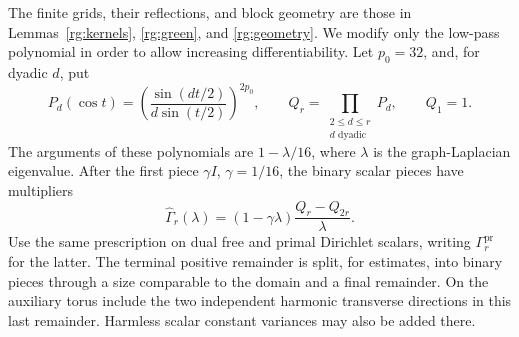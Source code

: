 The finite grids, their reflections, and block geometry are those in
Lemmas~\ref{rg:kernels}, \ref{rg:green}, and \ref{rg:geometry}. We modify
only the low-pass polynomial in order to allow increasing differentiability.
Let $p_0=32$, and, for dyadic $d$, put
\[
 P_d(\cos t)=\left(\frac{\sin(dt/2)}{d\sin(t/2)}\right)^{2p_0},
 \qquad Q_r=\prod_{\substack{2\le d\le r\\d\text{ dyadic}}}P_d,
 \qquad Q_1=1.
\]
The arguments of these polynomials are $1-\lambda/16$, where $\lambda$
is the graph-Laplacian eigenvalue. After the first piece $\gamma I$,
$\gamma=1/16$, the binary scalar pieces have multipliers
\begin{equation}\label{xyh:binary-multiplier}
 \widehat\Gamma_r(\lambda)
  =(1-\gamma\lambda)\frac{Q_r-Q_{2r}}{\lambda}.
\end{equation}
Use the same prescription on dual free and primal Dirichlet scalars,
writing $\Gamma_r^{\mathrm{pr}}$ for the latter. The terminal positive
remainder is split, for estimates, into binary pieces through a size
comparable to the domain and a final remainder. On the auxiliary torus
include the two independent harmonic transverse directions in this last
remainder. Harmless scalar constant variances may also be added there.

